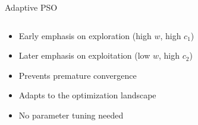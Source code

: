 \documentclass[aspectratio=169,xcolor=table]{beamer}
\begin{document}
\begin{frame}{Adaptive PSO}
\begin{columns}
\begin{column}{0.45\textwidth}
      
      \vspace{0.5cm}
      
      \begin{tcolorbox}[
        enhanced,
        colback=yellow!5,
        colframe=yellow!70,
        arc=2mm,
        title=Benefits,
        fonttitle=\bfseries\large,
        boxrule=0.5mm
      ]
        \begin{itemize}
          \item Early emphasis on exploration (high $w$, high $c_1$)
          \item Later emphasis on exploitation (low $w$, high $c_2$)
          \item Prevents premature convergence
          \item Adapts to the optimization landscape
          \item No parameter tuning needed
        \end{itemize}
      \end{tcolorbox}
    \end{column}
  \end{columns}
\end{frame}
\end{document}

